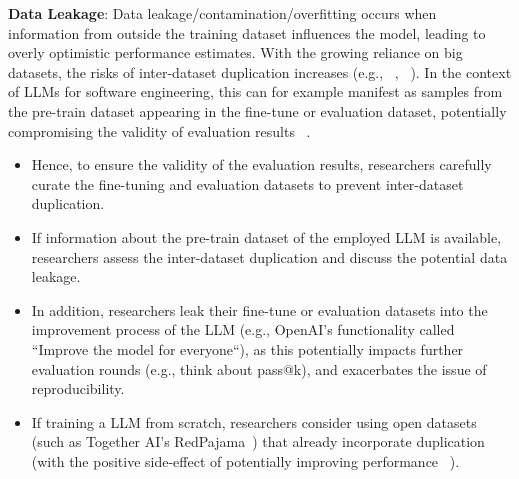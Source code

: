 \textbf{Data Leakage}:
Data leakage/contamination/overfitting occurs when information from outside the training dataset influences the model, leading to overly optimistic performance estimates. With the growing reliance on big datasets, the risks of inter-dataset duplication increases (e.g., ~\cite{DBLP:journals/pacmpl/LopesMMSYZSV17}, ~\cite{DBLP:conf/oopsla/Allamanis19}). 
In the context of LLMs for software engineering, this can for example manifest as samples from the pre-train dataset appearing in the fine-tune or evaluation dataset, potentially compromising the validity of evaluation results ~\cite{DBLP:journals/tse/LopezCSSV25}. 
\begin{itemize}
  \item Hence, to ensure the validity of the evaluation results, researchers \should carefully curate the fine-tuning and evaluation datasets to prevent inter-dataset duplication. 
  \item If information about the pre-train dataset of the employed LLM is available, researchers \should assess the inter-dataset duplication and \must discuss the potential data leakage.
  \item In addition, researchers \mustnot leak their fine-tune or evaluation datasets into the improvement process of the LLM (e.g., OpenAI's functionality called ``Improve the model for everyone``), as this potentially impacts further evaluation rounds (e.g., think about pass@k), and exacerbates the issue of reproducibility.
  \item If training a LLM from scratch, researchers \may consider using open datasets (such as Together AI's RedPajama~\cite{together2023redpajama}) that already incorporate duplication (with the positive side-effect of potentially improving performance ~\cite{DBLP:conf/acl/LeeINZECC22}).
\end{itemize}

